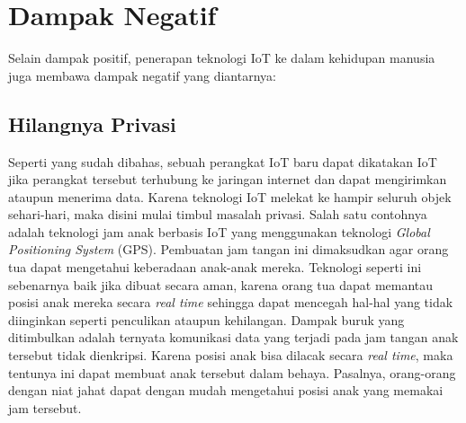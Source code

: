 \documentclass[12pt, letterpaper]{article}
\begin{document}
\newpage
\section{Dampak Negatif}
Selain dampak positif, penerapan teknologi IoT ke dalam kehidupan manusia juga membawa dampak negatif yang diantarnya:

\subsection{Hilangnya Privasi}
Seperti yang sudah dibahas, sebuah perangkat IoT baru dapat dikatakan IoT jika perangkat tersebut terhubung ke jaringan internet dan dapat mengirimkan ataupun menerima data. Karena teknologi IoT melekat ke hampir seluruh objek sehari-hari, maka disini mulai timbul masalah privasi. 
\newline
\indent
Salah satu contohnya adalah teknologi jam anak berbasis IoT yang menggunakan teknologi \textit{Global Positioning System} (GPS). Pembuatan jam tangan ini dimaksudkan agar orang tua dapat mengetahui keberadaan anak-anak mereka. Teknologi seperti ini sebenarnya baik jika dibuat secara aman, karena orang tua dapat memantau posisi anak mereka secara \textit{real time} sehingga dapat mencegah hal-hal yang tidak diinginkan seperti penculikan ataupun kehilangan.
\newline
\indent
Dampak buruk yang ditimbulkan adalah ternyata komunikasi data yang terjadi pada jam tangan anak tersebut tidak dienkripsi. \cite{threatpost19} Karena posisi anak bisa dilacak secara \textit{real time}, maka tentunya ini dapat membuat anak tersebut dalam behaya. Pasalnya, orang-orang dengan niat jahat dapat dengan mudah mengetahui posisi anak yang memakai jam tersebut.
\end{document}

